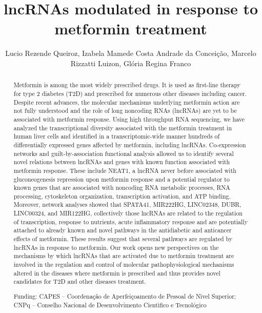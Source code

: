 \documentclass[twoside]{article}
\title{\vspace{-15mm}\fontsize{24pt}{10pt}\selectfont\textbf{ lncRNAs modulated in response to metformin treatment }} %
\author{ Lucio Rezende Queiroz, Izabela Mamede Costa Andrade da Concei\c{c}\~ao, Marcelo Rizzatti Luizon, Gl\'oria Regina Franco }
\affil{ Universidade Federal de Minas Gerais }
\date{}
\begin{document}
  
  
  \maketitle %
  
  
  \thispagestyle{fancy} %
  
  
  \begin{abstract}
  Metformin is among the most widely prescribed drugs. It is used as first-line therapy for type 2 diabetes (T2D) and prescribed for numerous other diseases including cancer. Despite recent advances,  the molecular mechanisms underlying metformin action are not fully understood and the role of long noncoding RNAs (lncRNAs) are yet to be associated with metformin response. Using high throughput RNA sequencing,  we have analyzed the transcriptional diversity associated with the metformin treatment in human liver cells and identified in a transcriptomic-wide manner hundreds of differentially expressed genes affected by metformin,  including lncRNAs. Co-expression networks and guilt-by-association functional analysis allowed us to identify several novel relations between lncRNAs and genes with known function associated with metformin response.
These include NEAT1,  a lncRNA never before associated with gluconeogenesis repression upon metformin response and a potential regulator to known genes that are associated with noncoding RNA metabolic processes,  RNA processing,  cytoskeleton organization,  transcription activation,  and ATP binding. Moreover,  network analyses showed that SPATA41,  MIR222HG,  LINC02348,  DUBR,  LINC00324,  and MIR122HG,  collectively those lncRNAs are related to the regulation of transcription,  response to nutrients,  acute inflammatory response and are potentially attached to already known and novel pathways in the antidiabetic and anticancer effects of metformin. 
These results suggest that several pathways are regulated by lncRNAs in response to metformin. Our work opens new perspectives on the mechanisms by which lncRNAs that are activated due to metformin treatment are involved in the regulation and control of molecular pathophysiological mechanisms altered in the diseases where metformin is prescribed and thus provides novel candidates for T2D and other diseases treatment.
  
  Funding: CAPES – Coordena\c{c}\~ao de Aperfei\c{c}oamento de Pessoal de N\'{\i}vel Superior; CNPq – Conselho Nacional de Desenvolvimento Cient\'{\i}fico e Tecnol\'ogico \\ 
  \end{abstract}
  
\end{document}
